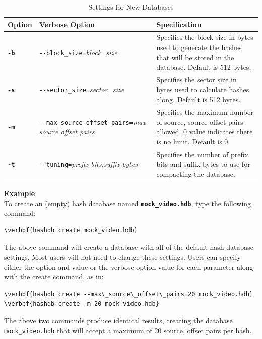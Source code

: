 \documentclass[11pt,fleqn]{article} %
\begin{document}
\begin{table}[!ht]
\centering
\caption{Settings for New Databases}
\label{tab:hashDBSettings}
\begin{tabular}{|p{1.5 cm}|p{8 cm}|p{4 cm}|}
\hline \hline
\textbf{Option} & \textbf{Verbose Option} & \textbf{Specification} \\
\hline
\textbf{\texttt{-b}} & \verb+--block_size=+\textit{block\_size} & Specifies the block size in bytes used to generate the hashes that will be stored in the database. Default is 512 bytes.  \\
\hline
\textbf{\texttt{-s}} & \verb+--sector_size=+\textit{sector\_size} & Specifies the sector size in bytes used to calculate hashes along. Default is 512 bytes.  \\
\hline
\textbf{\texttt{-m}} & \verb+--max_source_offset_pairs=+\textit{max source offset pairs} & Specifies the maximum number of source, source offset pairs allowed. 0 value indicates there is no limit. Default is 0.\\
\hline
\textbf{\texttt{-t}} & \verb+--tuning=+\textit{prefix bits:suffix bytes} & Specifies the number of prefix bits and suffix bytes to use for compacting the database.\\
\hline
\end{tabular}
\end{table}

\textbf{Example}\\
To create an (empty) hash database named \textbf{\texttt{mock\_video.hdb}}, type the following command:
\begin{Verbatim}[commandchars=\\\{\}]
\verbbf{hashdb create mock_video.hdb}
\end{Verbatim}
The above command will create a database with all of the default hash database settings. Most users will not need to change these settings.
Users can specify either the option and value or the verbose option value for each parameter along with the create command, as in:\\
\begin{Verbatim}[commandchars=\\\{\}]
\verbbf{hashdb create --max\_source\_offset\_pairs=20 mock_video.hdb}
\verbbf{hashdb create -m 20 mock_video.hdb}
\end{Verbatim}
The above two commands produce identical results, creating the database \texttt{mock\_video.hdb} that will accept a maximum of 20 source, offset pairs per hash.\\
\end{document}

